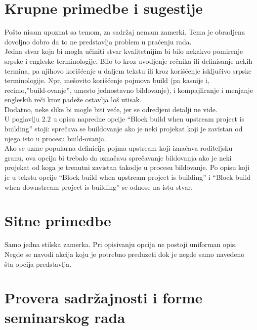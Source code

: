\documentclass[a4paper]{report}
\begin{document}
\section{Krupne primedbe i sugestije}
Pošto nisam upoznat sa temom, za sadržaj nemam zamerki. Tema je obradjena dovoljno dobro da to ne predstavlja problem u praćenju rada.\\
Jedna stvar koja bi mogla učiniti stvar kvalitetnijim bi bilo nekakvo pomirenje srpske i engleske terminologije. Bilo to kroz uvodjenje rečnika ili definisanje nekih termina, pa njihovo korišćenje u daljem tekstu ili kroz korišćenje isključivo srpske terminologije. Npr, mešovito korišćenje pojmova build (pa kasnije i, recimo,''build-ovanje'', umesto jednostavno bildovanje), i kompajliranje i menjanje engleskih reči kroz padeže ostavlja loš utisak. \\
Dodatno, neke slike bi mogle biti veće, jer se odredjeni detalji ne vide.\\

U poglavlju 2.2 u opisu napredne opcije ``Block build when upstream project is building'' stoji: sprečava se buildovanje ako je neki projekat koji je zavistan od njega isto u procesu build-ovanja. \\Ako se uzme popularna definicija pojma upstream koji iznačava roditeljsku granu, ova opcija bi trebalo da označava sprečavanje bildovanja ako je neki projekat od koga je trenutni zavistan takodje u procesu bildovanje. Po opisu koji je u tekstu opcije ``Block build when upstream project is building'' i ``Block build when downstream project is building'' se odnose na istu stvar.

\section{Sitne primedbe}
Samo jedna stilska zamerka. Pri opisivanju opcija ne postoji uniforman opis. Negde se navodi akcija koju je potrebno preduzeti dok je negde samo navedeno šta opcija predstavlja.

\section{Provera sadržajnosti i forme seminarskog rada}
\end{document}
